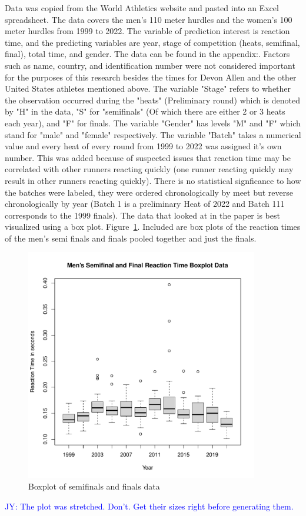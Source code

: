 \documentclass[12pt, letterpaper, titlepage]{article}
\newcommand{\jy}[1]{\textcolor{blue}{JY: #1}}
\begin{document}
Data was copied from the World Athletics website and pasted into an Excel
spreadsheet. The data covers the men's 110 meter hurdles and the women's 100
meter hurdles from 1999 to 2022.  The variable of prediction interest is reaction
time, and the predicting variables are year, stage of competition (heats, 
semifinal, final), total time, and gender.  The data can be found in the appendix:.  
Factors such as name, country, and identification number were
not considered important for the purposes of this research besides the times for
Devon Allen and the other United States athletes mentioned above.  The variable "Stage"
refers to whether the observation occurred during the "heats" (Preliminary round) which
is denoted by "H" in the data, "S" for "semifinals" (Of which there are either 2 or 3 
heats each year), and "F" for finals. The variable "Gender" has levels "M" and "F" 
which stand for "male" and "female" respectively.  The variable "Batch" takes a 
numerical value and every heat of every round from 1999 to 2022 was assigned it's
own number.  This was added because of suspected issues that reaction time may be
correlated with other runners reacting quickly (one runner reacting quickly may
result in other runners reacting quickly).  There is no statistical signficance to
how the batches were labeled, they were ordered chronologically by meet but
reverse chronologically by year (Batch 1 is a preliminary Heat of 2022 and Batch
111 corresponds to the 1999 finals). The data that looked at in the paper
is best visualized using a box plot. Figure~\ref{fig:DataBoxPlot}.  Included are
box plots of the reaction times of the men's semi finals and finals pooled
together and just the finals.
\begin{figure}[h]
  \centering 
  \includegraphics[width=\textwidth,height=4in]{DataBoxPlot}
  \caption{Boxplot of semifinals and finals data}\label{fig:DataBoxPlot}
\end{figure}
\jy{The plot was stretched. Don't. Get their sizes right before generating them.}
\end{document}
